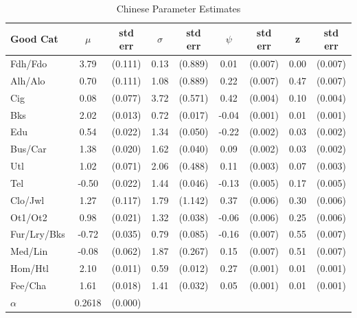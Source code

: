 \documentclass[12pt]{article}
\begin{document}
\begin{table}[!ht]
    \centering
	\begin{tabular}{lcccccccc}
		\hline\hline
		Good Cat & $\mu$ & std err      & $\sigma$ & std err  & $\psi$ & std err & z & std err\\
		\hline 
		Fdh/Fdo     &  3.79 & (0.111) & 0.13 & (0.889) &  0.01 & (0.007)& 0.00 & (0.007)\\
		Alh/Alo     &  0.70 & (0.111) & 1.08 & (0.889) &  0.22 & (0.007)& 0.47 & (0.007)\\
		Cig         &  0.08 & (0.077) & 3.72 & (0.571) &  0.42 & (0.004)& 0.10 & (0.004)\\
		Bks         &  2.02 & (0.013) & 0.72 & (0.017) & -0.04 & (0.001)& 0.01 & (0.001)\\
		Edu         &  0.54 & (0.022) & 1.34 & (0.050) & -0.22 & (0.002)& 0.03 & (0.002)\\
		Bus/Car     &  1.38 & (0.020) & 1.62 & (0.040) &  0.09 & (0.002)& 0.03 & (0.002)\\
		Utl         &  1.02 & (0.071) & 2.06 & (0.488) &  0.11 & (0.003)& 0.07 & (0.003)\\
		Tel         & -0.50 & (0.022) & 1.44 & (0.046) & -0.13 & (0.005)& 0.17 & (0.005)\\
		Clo/Jwl     &  1.27 & (0.117) & 1.79 & (1.142) &  0.37 & (0.006)& 0.30 & (0.006)\\
		Ot1/Ot2     &  0.98 & (0.021) & 1.32 & (0.038) & -0.06 & (0.006)& 0.25 & (0.006)\\
		Fur/Lry/Bks & -0.72 & (0.035) & 0.79 & (0.085) & -0.16 & (0.007)& 0.55 & (0.007)\\
		Med/Lin     & -0.08 & (0.062) & 1.87 & (0.267) &  0.15 & (0.007)& 0.51 & (0.007)\\
		Hom/Htl     &  2.10 & (0.011) & 0.59 & (0.012) &  0.27 & (0.001)& 0.01 & (0.001)\\
		Fee/Cha     &  1.61 & (0.018) & 1.41 & (0.032) &  0.05 & (0.001)& 0.01 & (0.001)\\
		\hline
		$\alpha$ & 0.2618 & (0.000) & & & & \\
		\hline
	\end{tabular}
     	\linebreak
    \caption{Chinese Parameter Estimates}
    \label{tab:chnparest}
\end{table}
\end{document}
